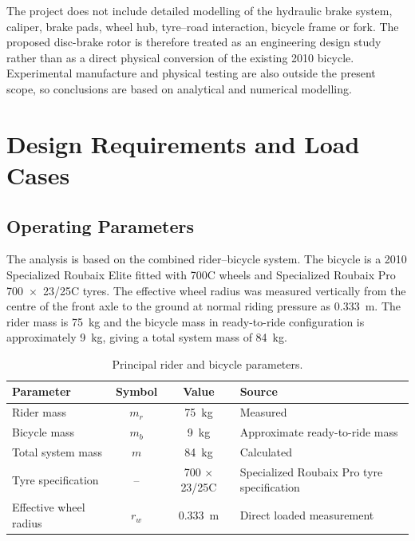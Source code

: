 \documentclass[11pt,a4paper]{article}
\begin{document}
The project does not include detailed modelling of the hydraulic brake system,
caliper, brake pads, wheel hub, tyre--road interaction, bicycle frame or fork.
The proposed disc-brake rotor is therefore treated as an engineering design
study rather than as a direct physical conversion of the existing 2010 bicycle.
Experimental manufacture and physical testing are also outside the present scope,
so conclusions are based on analytical and numerical modelling.


\section{Design Requirements and Load Cases}

\subsection{Operating Parameters}

The analysis is based on the combined rider--bicycle system. The bicycle is a
2010 Specialized Roubaix Elite fitted with 700C wheels and Specialized Roubaix
Pro 700~$\times$~23/25C tyres. The effective wheel radius was measured
vertically from the centre of the front axle to the ground at normal riding
pressure as \SI{0.333}{m}. The rider mass is \SI{75}{kg} and the bicycle mass
in ready-to-ride configuration is approximately \SI{9}{kg}, giving a total
system mass of \SI{84}{kg}.

\begin{table}[H]
    \centering
    \caption{Principal rider and bicycle parameters.}
    \label{tab:parameters}
    \begin{tabularx}{\textwidth}{l c c X}
        \toprule
        Parameter & Symbol & Value & Source \\
        \midrule

        Rider mass
        & $m_r$
        & \SI{75}{kg}
        & Measured \\

        Bicycle mass
        & $m_b$
        & \SI{9}{kg}
        & Approximate ready-to-ride mass \\

        Total system mass
        & $m$
        & \SI{84}{kg}
        & Calculated \\

        Tyre specification
        & --
        & 700 $\times$ 23/25C
        & Specialized Roubaix Pro tyre specification \\

        Effective wheel radius
        & $r_w$
        & \SI{0.333}{m}
        & Direct loaded measurement \\

        \bottomrule
    \end{tabularx}
\end{table}
\end{document}
